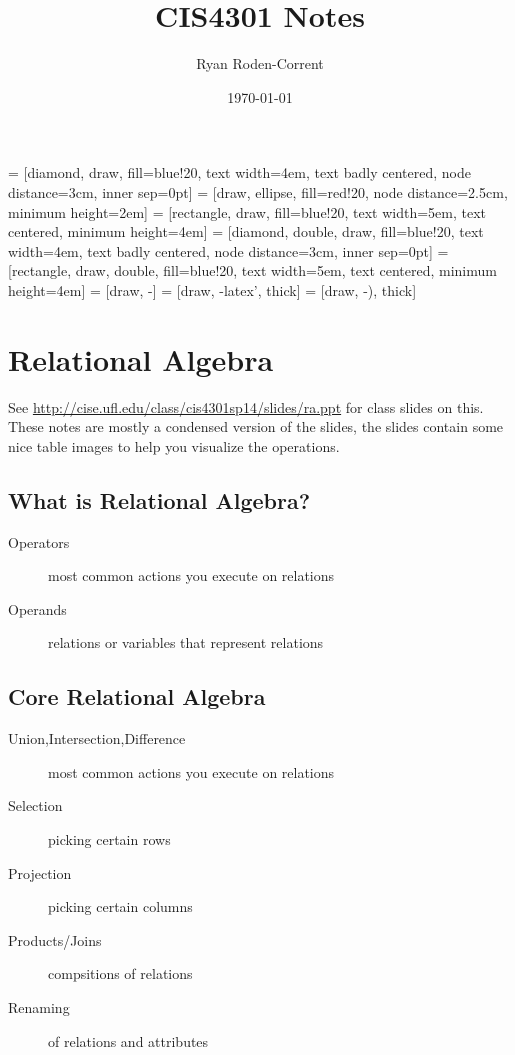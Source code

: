 \documentclass[12pt]{article}
\title{CIS4301 Notes}
\author{Ryan Roden-Corrent}
\date{\today}
\begin{document}
\setlength\parindent{0pt}
 = [diamond, draw, fill=blue!20, text width=4em,
  text badly centered, node distance=3cm, inner sep=0pt]
 = [draw, ellipse, fill=red!20, node distance=2.5cm,
  minimum height=2em]
 = [rectangle, draw, fill=blue!20, text width=5em,
  text centered, minimum height=4em]
 = [diamond, double, draw, fill=blue!20, text width=4em,
  text badly centered, node distance=3cm, inner sep=0pt]
 = [rectangle, draw, double, fill=blue!20, text width=5em,
  text centered, minimum height=4em]
 = [draw, -]
 = [draw, -latex', thick]
 = [draw, -), thick]
\maketitle
\section{Relational Algebra}
See \url{http://cise.ufl.edu/class/cis4301sp14/slides/ra.ppt} for class slides
on this. These notes are mostly a condensed version of the slides, the slides
contain some nice table images to help you visualize the operations.

\subsection{What is Relational Algebra?}
\begin{description}
    \item[Operators] {most common actions you execute on relations}
    \item[Operands] {relations or variables that represent relations}
\end{description}

\subsection{Core Relational Algebra}
\begin{description}
    \item[Union,Intersection,Difference] {most common actions you execute on
        relations} 
    \item[Selection] {picking certain rows}
    \item[Projection] {picking certain columns}
    \item[Products/Joins] {compsitions of relations}
    \item[Renaming] {of relations and attributes}
\end{description}
\end{document}
